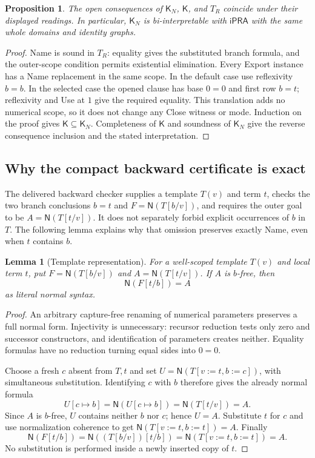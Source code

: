 \documentclass[11pt,letterpaper]{article}
\newtheorem{lemma}[theorem]{Lemma}
\newtheorem{proposition}[theorem]{Proposition}
\theoremstyle{definition}\newtheorem{definition}[theorem]{Definition}
\theoremstyle{remark}\newtheorem{remark}[theorem]{Remark}
\newcommand{\ipra}{\mathsf{iPRA}}
\newcommand{\K}{\mathsf K}
\newcommand{\KN}{\mathsf K_{\!N}}
\newcommand{\NF}{\mathsf N}
\begin{document}
\begin{proposition}\label{prop:name}
The open consequences of $\KN$, $\K$, and $T_R$ coincide under their
displayed readings. In particular, $\KN$ is bi-interpretable with
$\ipra$ with the same whole domains and identity graphs.
\end{proposition}
\begin{proof}
Name is sound in $T_R$: equality gives the substituted branch formula,
and the outer-scope condition permits existential elimination. Every
Export instance has a Name replacement in the same scope. In the default
case use reflexivity $b=b$. In the selected case the opened clause has
base $0=0$ and first row $b=t$; reflexivity and Use at $1$ give the
required equality. This translation adds no numerical scope, so it does
not change any Close witness or mode. Induction on the proof gives
$\K\subseteq\KN$. Completeness of $\K$ and soundness of $\KN$ give
the reverse consequence inclusion and the stated interpretation.
\end{proof}

\subsection{Why the compact backward certificate is exact}
The delivered backward checker supplies a template $T(v)$ and term $t$,
checks the two branch conclusions $b=t$ and $F=\NF(T[b/v])$, and
requires the outer goal to be $A=\NF(T[t/v])$. It does not separately
forbid explicit occurrences of $b$ in $T$. The following lemma explains
why that omission preserves exactly Name, even when $t$ contains $b$.

\begin{lemma}[Template representation]\label{lem:name-template}
For a well-scoped template $T(v)$ and local term $t$, put
$F=\NF(T[b/v])$ and $A=\NF(T[t/v])$. If $A$ is $b$-free, then
\[
                         \NF(F[t/b])=A
\]
as literal normal syntax.
\end{lemma}
\begin{proof}
An arbitrary capture-free renaming of numerical parameters preserves a
full normal form. Injectivity is unnecessary: recursor reduction tests
only zero and successor constructors, and identification of parameters
creates neither. Equality formulas have no reduction turning equal
sides into $0=0$.

Choose a fresh $c$ absent from $T,t$ and set
$U=\NF(T[v:=t,b:=c])$, with simultaneous substitution. Identifying
$c$ with $b$ therefore gives the already normal formula
\[
 U[c\mapsto b]=\NF(U[c\mapsto b])=\NF(T[t/v])=A.
\]
Since $A$ is $b$-free, $U$ contains neither $b$ nor $c$; hence $U=A$.
Substitute $t$ for $c$ and use normalization coherence to get
$\NF(T[v:=t,b:=t])=A$. Finally
\[
 \NF(F[t/b])
 =\NF((T[b/v])[t/b])
 =\NF(T[v:=t,b:=t])=A.
\]
No substitution is performed inside a newly inserted copy of $t$.
\end{proof}
\end{document}
